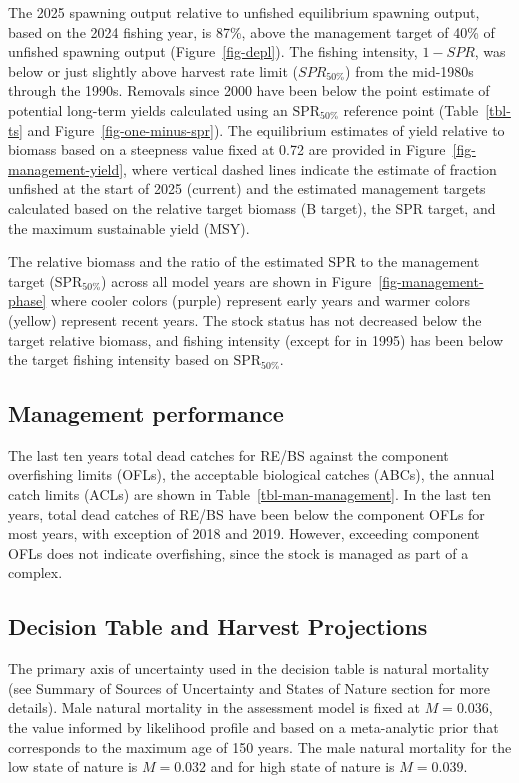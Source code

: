\documentclass[
  english,
]{article}
\begin{document}
The 2025 spawning output relative to unfished equilibrium spawning
output, based on the 2024 fishing year, is 87\%, above the management
target of 40\% of unfished spawning output (Figure~\ref{fig-depl}). The
fishing intensity, \(1-SPR\), was below or just slightly above harvest
rate limit (\(SPR_{50\%}\)) from the mid-1980s through the 1990s.
Removals since 2000 have been below the point estimate of potential
long-term yields calculated using an \(\text{SPR}_{50\%}\) reference
point (Table~\ref{tbl-ts} and Figure~\ref{fig-one-minus-spr}). The
equilibrium estimates of yield relative to biomass based on a steepness
value fixed at 0.72 are provided in Figure~\ref{fig-management-yield},
where vertical dashed lines indicate the estimate of fraction unfished
at the start of 2025 (current) and the estimated management targets
calculated based on the relative target biomass (B target), the SPR
target, and the maximum sustainable yield (MSY).

The relative biomass and the ratio of the estimated SPR to the
management target (\(\text{SPR}_{50\%}\)) across all model years are
shown in Figure~\ref{fig-management-phase} where cooler colors (purple)
represent early years and warmer colors (yellow) represent recent years.
The stock status has not decreased below the target relative biomass,
and fishing intensity (except for in 1995) has been below the target
fishing intensity based on \(\text{SPR}_{50\%}\).

\subsection{Management performance}\label{management-performance-1}

The last ten years total dead catches for RE/BS against the component
overfishing limits (OFLs), the acceptable biological catches (ABCs), the
annual catch limits (ACLs) are shown in Table~\ref{tbl-man-management}.
In the last ten years, total dead catches of RE/BS have been below the
component OFLs for most years, with exception of 2018 and 2019. However,
exceeding component OFLs does not indicate overfishing, since the stock
is managed as part of a complex.

\subsection{Decision Table and Harvest
Projections}\label{decision-table-and-harvest-projections-1}

The primary axis of uncertainty used in the decision table is natural
mortality (see Summary of Sources of Uncertainty and States of Nature
section for more details). Male natural mortality in the assessment
model is fixed at \(M = 0.036\), the value informed by likelihood
profile and based on a meta-analytic prior that corresponds to the
maximum age of 150 years. The male natural mortality for the low state
of nature is \(M = 0.032\) and for high state of nature is
\(M = 0.039\).
\end{document}
